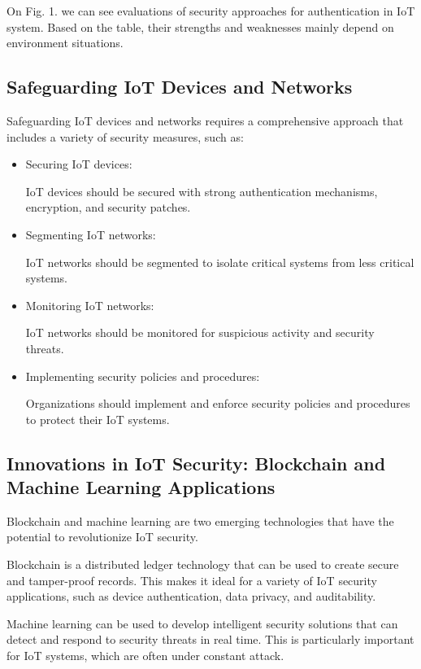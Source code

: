 \documentclass[conference]{IEEEtran}
\begin{document}
On Fig. 1.\cite{b15} we can see evaluations of security approaches for authentication in IoT system. Based on the table, their strengths and weaknesses mainly depend on environment situations. 
 
\subsection{Safeguarding IoT Devices and Networks}

Safeguarding IoT devices and networks requires a comprehensive approach that includes a variety of security measures, such as:
\begin{itemize}
    \item Securing IoT devices: 
    
    IoT devices should be secured with strong authentication mechanisms, encryption, and security patches.
    \item Segmenting IoT networks: 
    
    IoT networks should be segmented to isolate critical systems from less critical systems.
    \item Monitoring IoT networks:
    
    IoT networks should be monitored for suspicious activity and security threats.
    \item Implementing security policies and procedures: 
    
    Organizations should implement and enforce security policies and procedures to protect their IoT systems.
\end{itemize}


\subsection{Innovations in IoT Security: Blockchain and Machine Learning Applications
}
Blockchain and machine learning are two emerging technologies that have the potential to revolutionize IoT security.

Blockchain is a distributed ledger technology that can be used to create secure and tamper-proof records. This makes it ideal for a variety of IoT security applications, such as device authentication, data privacy, and auditability.

Machine learning can be used to develop intelligent security solutions that can detect and respond to security threats in real time. This is particularly important for IoT systems, which are often under constant attack.
\end{document}
